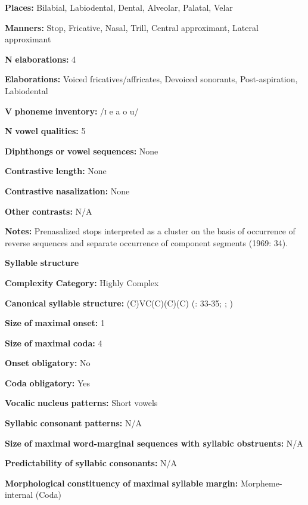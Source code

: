 \begin{styleBody}
\textbf{Places:} Bilabial, Labiodental, Dental, Alveolar, Palatal, Velar

\textbf{Manners:} Stop, Fricative, Nasal, Trill, Central approximant, Lateral approximant

\textbf{N} \textbf{elaborations:} 4

\textbf{Elaborations:} Voiced fricatives/affricates, Devoiced sonorants, Post-aspiration, Labiodental

\textbf{V} \textbf{phoneme} \textbf{inventory:} /ɪ e a o u/

\textbf{N} \textbf{vowel} \textbf{qualities:} 5

\textbf{Diphthongs} \textbf{or} \textbf{vowel} \textbf{sequences:} None

\textbf{Contrastive} \textbf{length:} None

\textbf{Contrastive} \textbf{nasalization:} None

\textbf{Other} \textbf{contrasts:} N/A

\textbf{Notes:} Prenasalized stops interpreted as a cluster on the basis of occurrence of reverse sequences and separate occurrence of component segments (1969: 34).

\textbf{Syllable} \textbf{structure}

\textbf{Complexity} \textbf{Category:} Highly Complex

\textbf{Canonical} \textbf{syllable} \textbf{structure:} (C)VC(C)(C)(C) (\citealt{Summer1969}: 33-35; \citealt{Sommer1981}; \citealt{Dixon1970})

\textbf{Size} \textbf{of} \textbf{maximal} \textbf{onset:} 1

\textbf{Size} \textbf{of} \textbf{maximal} \textbf{coda:} 4

\textbf{Onset} \textbf{obligatory:} No

\textbf{Coda} \textbf{obligatory:} Yes

\textbf{Vocalic} \textbf{nucleus} \textbf{patterns:} Short vowels

\textbf{Syllabic} \textbf{consonant} \textbf{patterns:} N/A

\textbf{Size} \textbf{of} \textbf{maximal} \textbf{word{}-marginal sequences with syllabic obstruents:} N/A

\textbf{Predictability} \textbf{of} \textbf{syllabic} \textbf{consonants:} N/A

\textbf{Morphological} \textbf{constituency} \textbf{of} \textbf{maximal} \textbf{syllable} \textbf{margin:} Morpheme-internal (Coda)


\end{styleBody}
